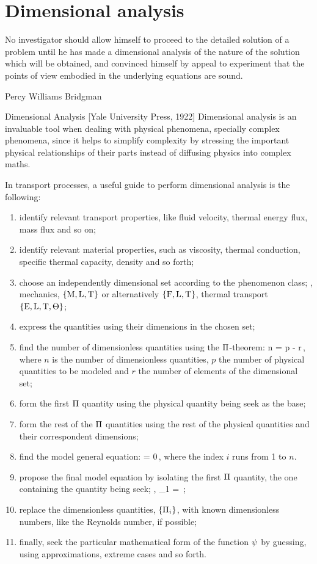 \section{Dimensional analysis}
%
\epigraph{No investigator should allow himself to proceed to the detailed solution of a problem until he has made a dimensional analysis of the nature of the solution which will be obtained, and convinced himself by appeal to experiment that the points of view embodied in the underlying equations are sound.}
{Percy Williams Bridgman}{Dimensional Analysis [Yale University Press, 1922]}
%
Dimensional analysis is an invaluable tool when dealing with physical phenomena, specially complex phenomena, since it helps to simplify complexity by stressing the important physical relationships of their parts instead of diffusing physics into complex maths.

In transport processes, a useful guide to perform dimensional analysis is the following:
\begin{enumerate}
\item identify relevant transport properties, like fluid velocity, thermal energy flux, mass flux and so on;
%
\item identify relevant material properties, such as viscosity, thermal conduction, specific thermal capacity, density and so forth;
%
\item choose an independently dimensional set according to the phenomenon class; \ie, mechanics, $\left\lbrace{\text{M}, \text{L}, \text{T}}\right\rbrace$ or alternatively $\left\lbrace{\text{F}, \text{L}, \text{T}}\right\rbrace$, thermal transport $\left\lbrace{\text{E}, \text{L}, \text{T}, \Theta}\right\rbrace$;
%
\item express the quantities using their dimensions in the chosen set;
%
\item find the number of dimensionless quantities using the $\Pi$-theorem:
\beq
n = p - r\,,
\eeq
where $n$ is the number of dimensionless quantities, $p$ the number of physical quantities to be modeled and $r$ the number of elements of the dimensional set;
%
\item form the first $\Pi$ quantity using the physical quantity being seek as the base;
%
\item form the rest of the $\Pi$ quantities using the rest of the physical quantities and their correspondent dimensions;
%
\item find the model general equation:
\beq
\dimfunc{} = 0\,,
\eeq
where the index $i$ runs from 1 to $n$.
%
\item propose the final model equation by isolating the first $\Pi$ quantity, the one containing the quantity being seek; \ie,
\beq
\kdim_1 = \dimfunc{}\,;
\eeq
%
\item replace the dimensionless quantities, $\left\lbrace{\Pi_i}\right\rbrace$, with known dimensionless numbers, like the Reynolds number, if possible;
%
\item finally, seek the particular mathematical form of the function $\psi$ by guessing, using approximations, extreme cases and so forth.
\end{enumerate}

